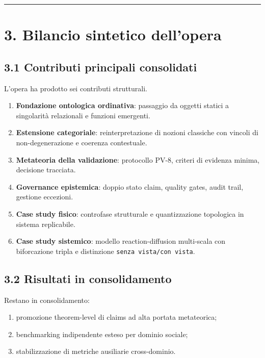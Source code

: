 \begin{center}\rule{0.5\linewidth}{0.5pt}\end{center}

\section{3. Bilancio sintetico dell'opera}

\subsection{3.1 Contributi principali consolidati}

L'opera ha prodotto sei contributi strutturali.

\begin{enumerate}
\def\labelenumi{\arabic{enumi}.}
\tightlist
\item
  \textbf{Fondazione ontologica ordinativa}: passaggio da oggetti statici a singolarità relazionali e funzioni emergenti.
\item
  \textbf{Estensione categoriale}: reinterpretazione di nozioni classiche con vincoli di non-degenerazione e coerenza contestuale.
\item
  \textbf{Metateoria della validazione}: protocollo PV-8, criteri di evidenza minima, decisione tracciata.
\item
  \textbf{Governance epistemica}: doppio stato claim, quality gates, audit trail, gestione eccezioni.
\item
  \textbf{Case study fisico}: controfase strutturale e quantizzazione topologica in sistema replicabile.
\item
  \textbf{Case study sistemico}: modello reaction-diffusion multi-scala con biforcazione tripla e distinzione \texttt{senza\ vista/con\ vista}.
\end{enumerate}

\subsection{3.2 Risultati in consolidamento}

Restano in consolidamento:

\begin{enumerate}
\def\labelenumi{\arabic{enumi}.}
\tightlist
\item
  promozione theorem-level di claims ad alta portata metateorica;
\item
  benchmarking indipendente esteso per dominio sociale;
\item
  stabilizzazione di metriche ausiliarie cross-dominio.
\end{enumerate}

